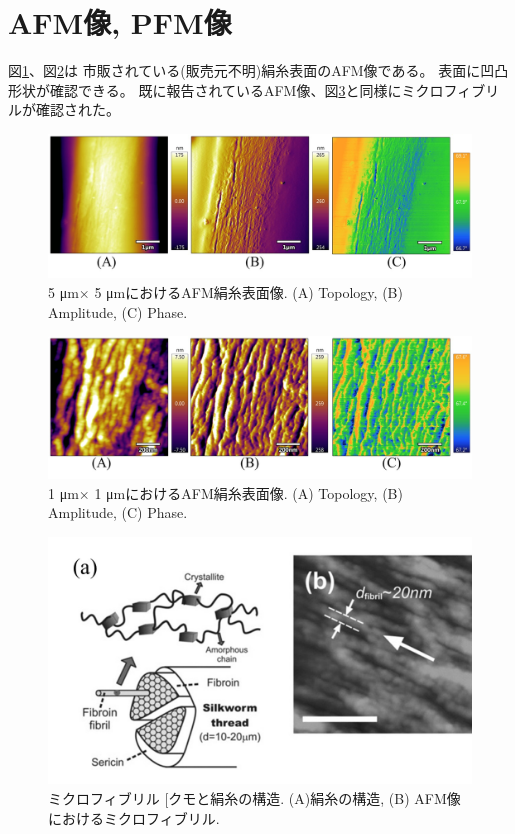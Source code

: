 \documentclass[dvipdfmx,12pt,a4paper]{jreport}
\makeatletter
\DeclareRobustCommand\cite{\unskip
    	\@ifnextchar[{\@tempswatrue\@citex}{\@tempswafalse\@citex[]}}
\makeatother
\begin{document}
			\section{AFM像, PFM像}
			図\ref{5_5_AFM_silk}、図\ref{1_1_AFM_silk}は
			市販されている(販売元不明)絹糸表面のAFM像である。
			表面に凹凸形状が確認できる。
			既に報告されているAFM像、図\ref{先行研究_AFM_糸}と同様にミクロフィブリルが確認された。
			\begin{figure}[h]
				\centering
				\includegraphics[width=\linewidth]{AFM_5_5.jpg}
				\caption{5 \si{\micro\meter}$\times$ 5 \si{\micro\meter}におけるAFM絹糸表面像. 
				(A) Topology, (B) Amplitude, (C) Phase. }
				\label{5_5_AFM_silk}
			\end{figure}
			\begin{figure}[h]
				\centering
				\includegraphics[width=\linewidth]{AFM_1_1.jpg}
				\caption{1 \si{\micro\meter}$\times$ 1 \si{\micro\meter}におけるAFM絹糸表面像. 
				(A) Topology, (B) Amplitude, (C) Phase.}
				\label{1_1_AFM_silk}
			\end{figure}
			\begin{figure}[H]
				\centering
				\includegraphics[scale=0.5]{AFM_silk.jpg}
				\caption{ミクロフィブリル\cite{クモと絹糸の構造}. (A)絹糸の構造, (B) AFM像におけるミクロフィブリル.}
				\label{先行研究_AFM_糸}
			\end{figure}
\end{document}

